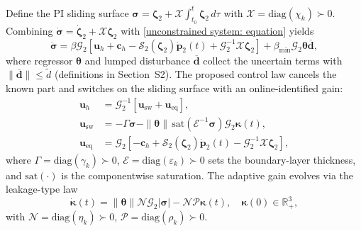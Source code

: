 Define the PI sliding surface $\boldsymbol{\sigma}=\boldsymbol{\zeta}_2+\mathcal{X}\!\int_{t_0}^{t}\boldsymbol{\zeta}_2\,d\tau$ with $\mathcal{X}=\text{diag}(\chi_k)\succ 0$. Combining $\dot{\boldsymbol{\sigma}}=\dot{\boldsymbol{\zeta}}_2+\mathcal{X}\boldsymbol{\zeta}_2$ with \eqref{unconstrained system: equation} yields
\begin{equation} \label{sigma derivative: equation 2}
    \dot{\boldsymbol{\sigma}} = \beta\mathcal{G}_2\!\left[\boldsymbol{u}_h+\boldsymbol{c}_h-\mathcal{S}_2(\boldsymbol{\zeta}_2)\dot{\boldsymbol{p}}_2(t)+\mathcal{G}_2^{-1}\mathcal{X}\boldsymbol{\zeta}_2\right] + \beta_{\min}\mathcal{G}_2\boldsymbol{\theta}\boldsymbol{\overline{d}},
\end{equation}
where regressor $\boldsymbol{\theta}$ and lumped disturbance $\boldsymbol{\overline{d}}$ collect the uncertain terms with $\|\boldsymbol{\overline{d}}\|\le\tilde{d}$ (definitions in Section~S2). The proposed control law cancels the known part and switches on the sliding surface with an online-identified gain:
\begin{align} \label{adaptive control law: equation}
    \boldsymbol{u}_h &= \mathcal{G}_2^{-1}[\boldsymbol{u}_\text{sw}+\boldsymbol{u}_\text{eq}],\nonumber\\
    \boldsymbol{u}_\text{sw} &= -\Gamma\boldsymbol{\sigma} - \|\boldsymbol{\theta}\|\,\text{sat}(\mathcal{E}^{-1}\boldsymbol{\sigma})\mathcal{G}_2\boldsymbol{\kappa}(t),\\
    \boldsymbol{u}_\text{eq} &= \mathcal{G}_2\!\left[-\boldsymbol{c}_h+\mathcal{S}_2(\boldsymbol{\zeta}_2)\dot{\boldsymbol{p}}_2(t)-\mathcal{G}_2^{-1}\mathcal{X}\boldsymbol{\zeta}_2\right],\nonumber
\end{align}
where $\Gamma=\text{diag}(\gamma_k)\succ 0$, $\mathcal{E}=\text{diag}(\varepsilon_k)\succ 0$ sets the boundary-layer thickness, and $\text{sat}(\cdot)$ is the componentwise saturation. The adaptive gain evolves via the leakage-type law
\begin{equation} \label{adaptive law: equation}
    \dot{\boldsymbol{\kappa}}(t) = \|\boldsymbol{\theta}\|\mathcal{N}\mathcal{G}_2|\boldsymbol{\sigma}| - \mathcal{N}\mathcal{P}\boldsymbol{\kappa}(t),\quad\boldsymbol{\kappa}(0)\in\mathbb{R}_+^3,
\end{equation}
with $\mathcal{N}=\text{diag}(\eta_k)\succ 0$, $\mathcal{P}=\text{diag}(\rho_k)\succ 0$.

